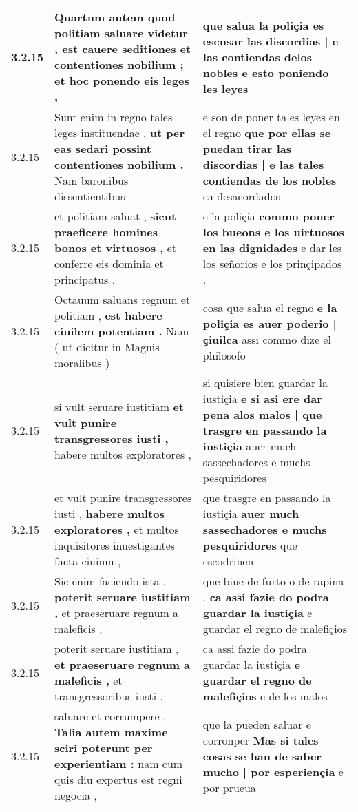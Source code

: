 \begin{tabular}{|p{1cm}|p{6.5cm}|p{6.5cm}|}
3.2.15 & Quartum autem quod politiam saluare videtur , \textbf{ est cauere seditiones et contentiones nobilium ; } et hoc ponendo eis leges , & que salua la poliçia \textbf{ es escusar las discordias | e las contiendas delos nobles } e esto poniendo les leyes \\\hline
3.2.15 & Sunt enim in regno tales leges instituendae , \textbf{ ut per eas sedari possint contentiones nobilium . } Nam baronibus dissentientibus & e son de poner tales leyes en el regno \textbf{ que por ellas se puedan tirar las discordias | e las tales contiendas de los nobles } ca desacordados \\\hline
3.2.15 & et politiam saluat , \textbf{ sicut praeficere homines bonos et virtuosos , } et conferre eis dominia et principatus . & e la poliçia \textbf{ commo poner los bueons e los uirtuosos en las dignidades } e dar les los señorios e los prinçipados . \\\hline
3.2.15 & Octauum saluans regnum et politiam , \textbf{ est habere ciuilem potentiam . } Nam ( ut dicitur in Magnis moralibus ) & cosa que salua el regno \textbf{ e la poliçia es auer poderio | çiuilca } assi commo dize el philosofo \\\hline
3.2.15 & si vult seruare iustitiam \textbf{ et vult punire transgressores iusti , } habere multos exploratores , & si quisiere bien guardar la iustiçia \textbf{ e si asi ere dar pena alos malos | que trasgre en passando la iustiçia } auer much sassechadores e muchs pesquiridores \\\hline
3.2.15 & et vult punire transgressores iusti , \textbf{ habere multos exploratores , } et multos inquisitores inuestigantes facta ciuium , & que trasgre en passando la iustiçia \textbf{ auer much sassechadores e muchs pesquiridores } que escodrinen \\\hline
3.2.15 & Sic enim faciendo ista , \textbf{ poterit seruare iustitiam , } et praeseruare regnum a maleficis , & que biue de furto o de rapina . \textbf{ ca assi fazie do podra guardar la iustiçia } e guardar el regno de malefiçios \\\hline
3.2.15 & poterit seruare iustitiam , \textbf{ et praeseruare regnum a maleficis , } et transgressoribus iusti . & ca assi fazie do podra guardar la iustiçia \textbf{ e guardar el regno de malefiçios } e de los malos \\\hline
3.2.15 & saluare et corrumpere . \textbf{ Talia autem maxime sciri poterunt per experientiam : } nam cum quis diu expertus est regni negocia , & que la pueden saluar e corronper \textbf{ Mas si tales cosas se han de saber mucho | por esperiençia } e por prueua \\\hline

\end{tabular}
